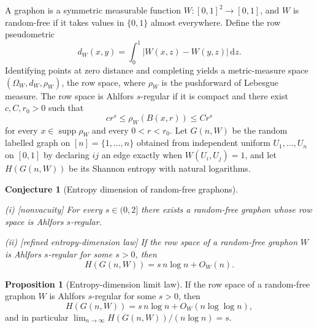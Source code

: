 \documentclass[11pt]{article}
\newtheorem{conjecture}{Conjecture}
\theoremstyle{definition}
\newtheorem{proposition}{Proposition}
\begin{document}
A graphon is a symmetric measurable function
$W:[0,1]^2\to[0,1]$, and $W$ is random-free if it takes values in
$\{0,1\}$ almost everywhere.  Define the row pseudometric
\[
d_W(x,y)=\int_0^1|W(x,z)-W(y,z)|\,\mathrm dz .
\]
Identifying points at zero distance and completing yields a
metric-measure space $(\Omega_W,d_W,\rho_W)$, the row space, where
$\rho_W$ is the pushforward of Lebesgue measure.  The row space is
Ahlfors $s$-regular if it is compact and there exist
$c,C,r_0>0$ such that
\[
cr^s\le\rho_W(B(x,r))\le Cr^s
\]
for every $x\in\operatorname{supp}\rho_W$ and every $0<r<r_0$.  Let
$G(n,W)$ be the random labelled graph on $[n]=\{1,\ldots,n\}$ obtained
from independent uniform $U_1,\ldots,U_n$ on $[0,1]$ by declaring
$ij$ an edge exactly when $W(U_i,U_j)=1$, and let $H(G(n,W))$ be its
Shannon entropy with natural logarithms.

\begin{conjecture}[Entropy dimension of random-free graphons]\label{t3}
\leavevmode

\emph{(i)} \textup{[nonvacuity]}  For every $s\in(0,2]$ there exists a
random-free graphon whose row space is Ahlfors $s$-regular.

\emph{(ii)} \textup{[refined entropy-dimension law]}  If the row space of a
random-free graphon $W$ is Ahlfors $s$-regular for some $s>0$, then
\[
H(G(n,W))=s\,n\log n+O_W(n) .
\]

\end{conjecture}

\begin{proposition}[Entropy-dimension limit law]\label{t3:limit}
If the row space of a random-free graphon $W$ is Ahlfors $s$-regular
for some $s>0$, then
\[
H(G(n,W))=s\,n\log n+O_W(n\log\log n),
\]
and in particular $\lim_{n\to\infty}H(G(n,W))/(n\log n)=s$.
\end{proposition}
\end{document}
